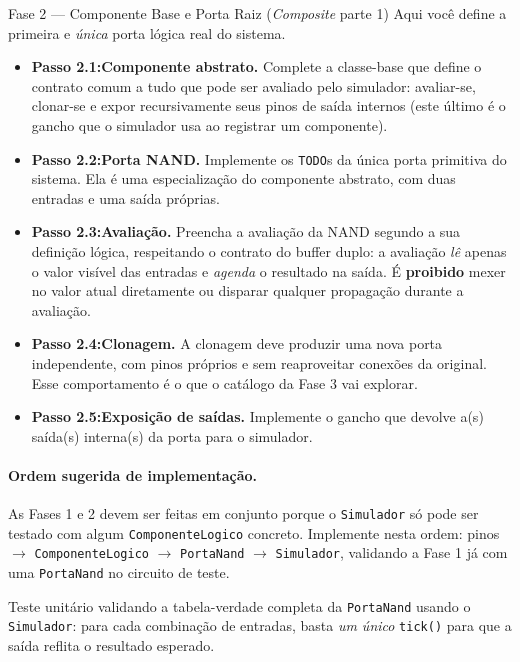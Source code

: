 \documentclass[11pt,a4paper]{article}
\begin{document}
\begin{phasebox}{Fase 2 — Componente Base e Porta Raiz (\textit{Composite} parte 1)}{}
Aqui você define a primeira e \emph{única} porta lógica real do sistema.

\begin{itemize}
    \item \textbf{Passo 2.1:Componente abstrato.} Complete a classe-base que define o contrato comum a tudo que pode ser avaliado pelo simulador: avaliar-se, clonar-se e expor recursivamente seus pinos de saída internos (este último é o gancho que o simulador usa ao registrar um componente).
    \item \textbf{Passo 2.2:Porta NAND.} Implemente os \texttt{TODO}s da única porta primitiva do sistema. Ela é uma especialização do componente abstrato, com duas entradas e uma saída próprias.
    \item \textbf{Passo 2.3:Avaliação.} Preencha a avaliação da NAND segundo a sua definição lógica, respeitando o contrato do buffer duplo: a avaliação \emph{lê} apenas o valor visível das entradas e \emph{agenda} o resultado na saída. É \textbf{proibido} mexer no valor atual diretamente ou disparar qualquer propagação durante a avaliação.
    \item \textbf{Passo 2.4:Clonagem.} A clonagem deve produzir uma nova porta independente, com pinos próprios e sem reaproveitar conexões da original. Esse comportamento é o que o catálogo da Fase 3 vai explorar.
    \item \textbf{Passo 2.5:Exposição de saídas.} Implemente o gancho que devolve a(s) saída(s) interna(s) da porta para o simulador.
\end{itemize}

\paragraph{Ordem sugerida de implementação.} As Fases 1 e 2 devem ser feitas em conjunto porque o \texttt{Simulador} só pode ser testado com algum \texttt{ComponenteLogico} concreto. Implemente nesta ordem: pinos $\to$ \texttt{ComponenteLogico} $\to$ \texttt{PortaNand} $\to$ \texttt{Simulador}, validando a Fase 1 já com uma \texttt{PortaNand} no circuito de teste.

\begin{acceptbox}
\vspace{2pt}
Teste unitário validando a tabela-verdade completa da \texttt{PortaNand} usando o \texttt{Simulador}: para cada combinação de entradas, basta \emph{um único} \texttt{tick()} para que a saída reflita o resultado esperado.
\end{acceptbox}
\end{phasebox}
\end{document}
